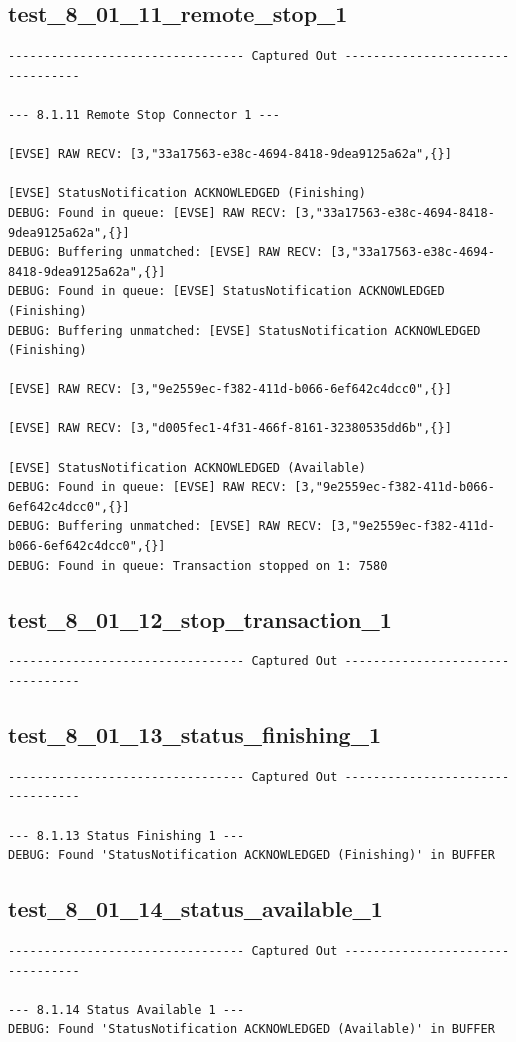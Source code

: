 \documentclass{article}
\begin{document}
\subsection*{test\_8\_01\_11\_remote\_stop\_1}
\begin{lstlisting}
--------------------------------- Captured Out ---------------------------------

--- 8.1.11 Remote Stop Connector 1 ---

[EVSE] RAW RECV: [3,"33a17563-e38c-4694-8418-9dea9125a62a",{}]

[EVSE] StatusNotification ACKNOWLEDGED (Finishing)
DEBUG: Found in queue: [EVSE] RAW RECV: [3,"33a17563-e38c-4694-8418-9dea9125a62a",{}]
DEBUG: Buffering unmatched: [EVSE] RAW RECV: [3,"33a17563-e38c-4694-8418-9dea9125a62a",{}]
DEBUG: Found in queue: [EVSE] StatusNotification ACKNOWLEDGED (Finishing)
DEBUG: Buffering unmatched: [EVSE] StatusNotification ACKNOWLEDGED (Finishing)

[EVSE] RAW RECV: [3,"9e2559ec-f382-411d-b066-6ef642c4dcc0",{}]

[EVSE] RAW RECV: [3,"d005fec1-4f31-466f-8161-32380535dd6b",{}]

[EVSE] StatusNotification ACKNOWLEDGED (Available)
DEBUG: Found in queue: [EVSE] RAW RECV: [3,"9e2559ec-f382-411d-b066-6ef642c4dcc0",{}]
DEBUG: Buffering unmatched: [EVSE] RAW RECV: [3,"9e2559ec-f382-411d-b066-6ef642c4dcc0",{}]
DEBUG: Found in queue: Transaction stopped on 1: 7580
\end{lstlisting}
\subsection*{test\_8\_01\_12\_stop\_transaction\_1}
\begin{lstlisting}
--------------------------------- Captured Out ---------------------------------
\end{lstlisting}
\subsection*{test\_8\_01\_13\_status\_finishing\_1}
\begin{lstlisting}
--------------------------------- Captured Out ---------------------------------

--- 8.1.13 Status Finishing 1 ---
DEBUG: Found 'StatusNotification ACKNOWLEDGED (Finishing)' in BUFFER
\end{lstlisting}
\subsection*{test\_8\_01\_14\_status\_available\_1}
\begin{lstlisting}
--------------------------------- Captured Out ---------------------------------

--- 8.1.14 Status Available 1 ---
DEBUG: Found 'StatusNotification ACKNOWLEDGED (Available)' in BUFFER
\end{lstlisting}
\end{document}
